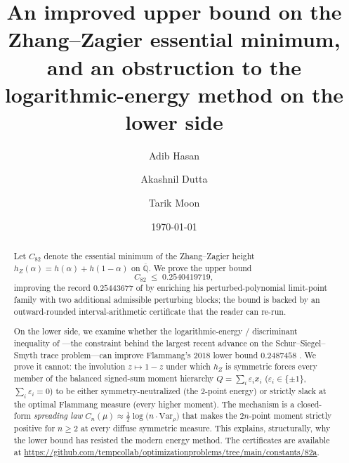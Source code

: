 \documentclass[11pt,reqno]{amsart}
\theoremstyle{plain}
\theoremstyle{definition}
\newcommand{\Q}{\mathbb{Q}}
\newcommand{\Qbar}{\overline{\Q}}
\newcommand{\hZ}{h_Z}
\newcommand{\Cee}{C_{82}}
\newcommand{\repo}{\url{https://github.com/tempcollab/optimizationproblems/tree/main/constants/82a}}
\begin{document}
\title[The Zhang--Zagier essential minimum and the energy method]
{An improved upper bound on the Zhang--Zagier essential minimum,\\
and an obstruction to the logarithmic-energy method on the lower side}

\author{Adib Hasan}
\address{SignalPilot AI}

\author{Akashnil Dutta}
\address{Incept Labs}

\author{Tarik Moon}
\address{SignalPilot AI}

\date{\today}


\begin{abstract}
Let $\Cee$ denote the essential minimum of the Zhang--Zagier height
$\hZ(\alpha)=h(\alpha)+h(1-\alpha)$ on $\Qbar$. We prove the upper bound
\[
  \Cee \;\le\; 0.2540419719,
\]
improving the record $0.25443677$ of \citet{Doc01b} by enriching his
perturbed-polynomial limit-point family with two additional admissible
perturbing blocks; the bound is backed by an outward-rounded interval-arithmetic
certificate that the reader can re-run.

On the lower side, we examine whether the logarithmic-energy / discriminant
inequality of \citet{OSS}---the constraint behind the largest recent advance on
the Schur--Siegel--Smyth trace problem---can improve Flammang's $2018$ lower bound
$0.2487458$ \citep{F18}. We prove it cannot: the involution $z\mapsto1-z$ under
which $\hZ$ is symmetric forces every member of the balanced signed-sum moment
hierarchy $Q=\sum_i\varepsilon_i x_i$ ($\varepsilon_i\in\{\pm1\}$,
$\sum_i\varepsilon_i=0$) to be either symmetry-neutralized (the $2$-point energy)
or strictly slack at the optimal Flammang measure (every higher moment). The
mechanism is a closed-form \emph{spreading law}
$C_n(\mu)\approx\frac12\log\bigl(n\cdot\mathrm{Var}_\rho\bigr)$ that makes the
$2n$-point moment strictly positive for $n\ge2$ at every diffuse symmetric
measure. This explains, structurally, why the lower bound has resisted the modern
energy method. The certificates are available at \repo.
\end{abstract}

\maketitle
\end{document}
